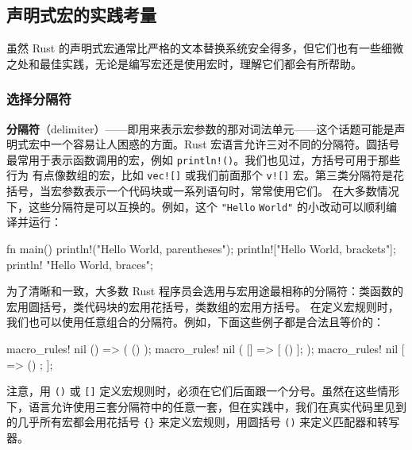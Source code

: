 \subsection{声明式宏的实践考量}
\label{idx:idx_5f10baf5}
虽然 Rust 的声明式宏通常比严格的文本替换系统安全得多，但它们也有一些细微之处和最佳实践，无论是编写宏还是使用宏时，理解它们都会有所帮助。
\subsubsection{选择分隔符}
\label{idx:idx_3c7ab202}
\label{idx:idx_ed95fe7d}
\textbf{分隔符}（delimiter）——即用来表示宏参数的那对词法单元——这个话题可能是声明式宏中一个容易让人困惑的方面。Rust 宏语言允许三对不同的分隔符。圆括号最常用于表示函数调用的宏，例如
\texttt{println!()}。我们也见过，方括号可用于那些行为
有点像数组的宏，比如 \texttt{vec![]} 或我们前面那个 \texttt{v![]} 宏。第三类分隔符是花括号，当宏参数表示一个代码块或一系列语句时，常常使用它们。
在大多数情况下，这些分隔符是可以互换的。例如，这个 \texttt{"Hello}
\texttt{World"} 的小改动可以顺利编译并运行：
\begin{codebox}[rust]
fn main() {
    println!("Hello World, parentheses");
    println!["Hello World, brackets"];
    println! {"Hello World, braces"};
}
\end{codebox}
为了清晰和一致，大多数 Rust 程序员会选用与宏用途最相称的分隔符：类函数的宏用圆括号，类代码块的宏用花括号，类数组的宏用方括号。
\label{idx:idx_91205f26}
在定义宏规则时，我们也可以使用任意组合的分隔符。例如，下面这些例子都是合法且等价的：
\begin{codebox}[text]
macro_rules! nil {
  () => ( () );
}
macro_rules! nil (
  [] => [ () ];
);
macro_rules! nil [
  {} => { () };
];
\end{codebox}
注意，用 \texttt{()} 或 \texttt{[]} 定义宏规则时，必须在它们后面跟一个分号。虽然在这些情形下，语言允许使用三套分隔符中的任意一套，但在实践中，我们在真实代码里见到的几乎所有宏都会用花括号 \texttt{\{\}} 来定义宏规则，用圆括号 \texttt{()} 来定义匹配器和转写器。
